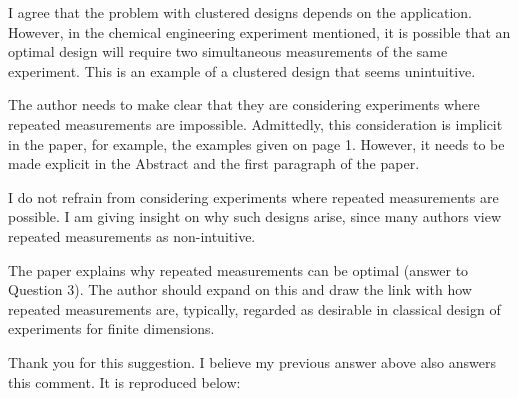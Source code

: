 \AR I agree that the problem with clustered designs depends on the
application. However, in the chemical engineering experiment
mentioned, it is possible that an optimal design will require two
simultaneous measurements of the same experiment. This is an example
of a clustered design that seems unintuitive.

 
\RC The author needs to make clear that they are considering
experiments where repeated measurements are impossible. Admittedly,
this consideration is implicit in the paper, for example, the examples
given on page 1. However, it needs to be made explicit in the Abstract
and the first paragraph of the paper.

\AR I do not refrain from considering experiments where repeated
measurements are possible. I am giving insight on why such designs
arise, since many authors view repeated measurements as non-intuitive.

  
\RC The paper explains why repeated measurements can be optimal
(answer to Question 3). The author should expand on this and draw the
link with how repeated measurements are, typically, regarded as
desirable in classical design of experiments for finite
dimensions.

\AR Thank you for this suggestion. I believe my previous answer above
also answers this comment. It is reproduced below:


